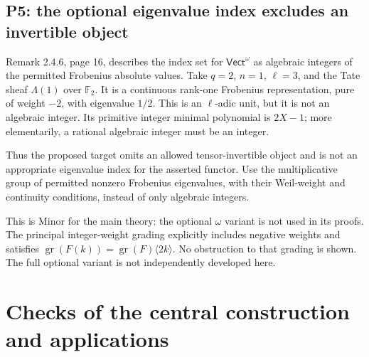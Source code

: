 \documentclass[10pt]{article}
\begin{document}
\subsection*{P5: the optional eigenvalue index excludes an invertible object}
Remark 2.4.6, page 16, describes the index set for \(\mathsf{Vect}^\omega\) as algebraic integers of the permitted Frobenius absolute values. Take \(q=2\), \(n=1\), \(\ell=3\), and the Tate sheaf \(\Lambda(1)\) over \(\mathbb F_2\). It is a continuous rank-one Frobenius representation, pure of weight \(-2\), with eigenvalue \(1/2\). This is an \(\ell\)-adic unit, but it is not an algebraic integer. Its primitive integer minimal polynomial is \(2X-1\); more elementarily, a rational algebraic integer must be an integer.\par
Thus the proposed target omits an allowed tensor-invertible object and is not an appropriate eigenvalue index for the asserted functor. Use the multiplicative group of permitted nonzero Frobenius eigenvalues, with their Weil-weight and continuity conditions, instead of only algebraic integers.\par
This is Minor for the main theory: the optional \(\omega\) variant is not used in its proofs. The principal integer-weight grading explicitly includes negative weights and satisfies \(\operatorname{gr}(F(k))=\operatorname{gr}(F)\langle2k\rangle\). No obstruction to that grading is shown. The full optional variant is not independently developed here.\par
\section*{Checks of the central construction and applications}
\end{document}
